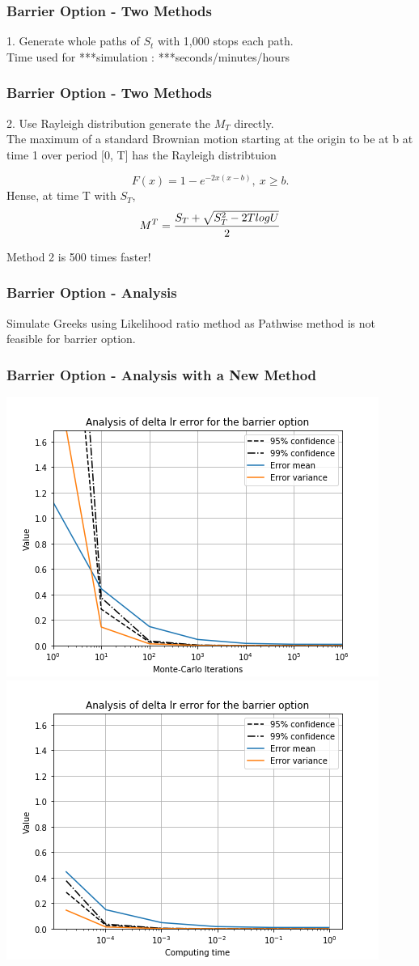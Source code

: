\documentclass[12pt]{beamer}
\begin{document}
\begin{frame}
\frametitle{Barrier Option - Two Methods}

1. Generate whole paths of $S_t$ with 1,000 stops each path.\\

Time used for ***simulation : ***seconds/minutes/hours

\end{frame}

\begin{frame}
\frametitle{Barrier Option - Two Methods}

2. Use Rayleigh distribution generate the $M_T$ directly. \\
The maximum of a standard Brownian motion starting at the origin to be at b at time 1 over period [0, T] has the Rayleigh distribtuion

$$F(x) = 1 - e^{-2x(x-b)}, \ x \geq b.$$
Hense, at time T with $S_T$,
$$M^T={S_T+\sqrt{S_T^2-2TlogU}\over 2}$$

Method 2 is 500 times faster!

\end{frame}

\begin{frame}
\frametitle{Barrier Option - Analysis}
Simulate Greeks using Likelihood ratio method as Pathwise method is not feasible for barrier option.


\end{frame}

\begin{frame}
\frametitle{Barrier Option - Analysis with a New Method}
\includegraphics[width=.5\textwidth]{graphs/barrierdeltalr.png}
\includegraphics[width=.5\textwidth]{graphs/barrierdeltalrtime.png}
\end{frame}
\end{document}
